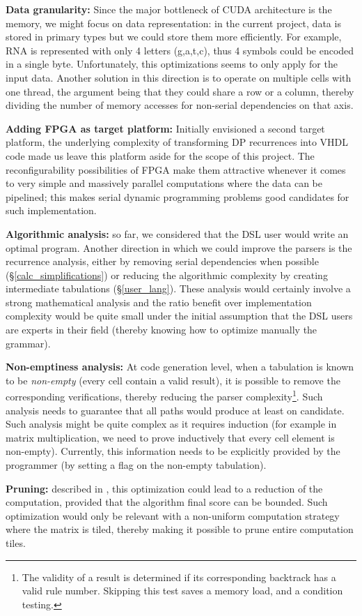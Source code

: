\item \textbf{Data granularity:} Since the major bottleneck of CUDA architecture is the memory, we might focus on data representation: in the current project, data is stored in primary types but we could store them more efficiently. For example, RNA is represented with only 4 letters (g,a,t,c), thus 4 symbols could be encoded in a single byte. Unfortunately, this optimizations seems to only apply for the input data. Another solution in this direction is to operate on multiple cells with one thread, the argument being that they could share a row or a column, thereby dividing the number of memory accesses for non-serial dependencies on that axis.
\item \textbf{Adding FPGA as target platform:} Initially envisioned a second target platform, the underlying complexity of transforming DP recurrences into VHDL code made us leave this platform aside for the scope of this project. The reconfigurability possibilities of FPGA make them attractive whenever it comes to very simple and massively parallel computations where the data can be pipelined; this makes serial dynamic programming problems good candidates for such implementation.
\item \textbf{Algorithmic analysis:} so far, we considered that the DSL user would write an optimal program. Another direction in which we could improve the parsers is the recurrence analysis, either by removing serial dependencies when possible (\S\ref{calc_simplifications}) or reducing the algorithmic complexity by creating intermediate tabulations (\S\ref{user_lang}). These analysis would certainly involve a strong mathematical analysis and the ratio benefit over implementation complexity would be quite small under the initial assumption that the DSL users are experts in their field (thereby knowing how to optimize manually the grammar).
\item \textbf{Non-emptiness analysis:} At code generation level, when a tabulation is known to be \textit{non-empty} (every cell contain a valid result), it is possible to remove the corresponding verifications, thereby reducing the parser complexity\footnote{The validity of a result is determined if its corresponding backtrack has a valid rule number. Skipping this test saves a memory load, and a condition testing.}. Such analysis needs to guarantee that all paths would produce at least on candidate. Such analysis might be quite complex as it requires induction (for example in matrix multiplication, we need to prove inductively that every cell element is non-empty). Currently, this information needs to be explicitly provided by the programmer (by setting a flag on the non-empty tabulation).
\item \textbf{Pruning:} described in \cite{swat_mega}, this optimization could lead to a reduction of the computation, provided that the algorithm final score can be bounded. Such optimization would only be relevant with a non-uniform computation strategy where the matrix is tiled, thereby making it possible to prune entire computation tiles.
\ole


